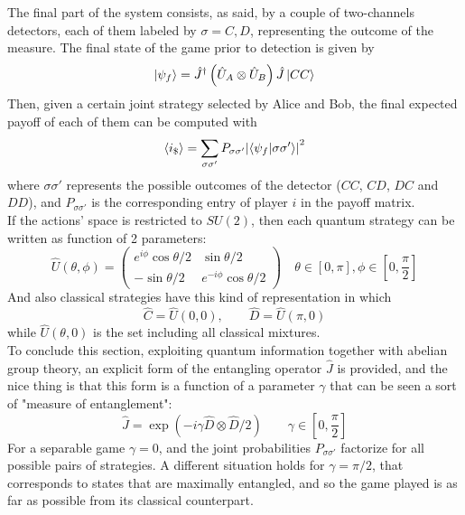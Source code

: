 The final part of the system consists, as said, by a couple of two-channels detectors, each of them labeled by $\sigma=C,D$, representing the outcome of the measure. The final state of the game prior to detection is given by
\[ \ket{\psi_f} = \hat{J}^\dagger\left(\hat{U}_A\otimes\hat{U}_B\right)\hat{J}\ket{CC} \]
Then, given a certain joint strategy selected by Alice and Bob, the final expected payoff of each of them can be computed with
\[ \expval{i_\$} = \sum_{\sigma\sigma'} P_{\sigma\sigma'}\abs{\bra{\psi_f}\ket{\sigma\sigma'}}^2 \]
where $\sigma\sigma'$ represents the possible outcomes of the detector ($CC$, $CD$, $DC$ and $DD$), and $P_{\sigma\sigma'}$ is the corresponding entry of player $i$ in the payoff matrix.\\
If the actions' space is restricted to $SU(2)$, then each quantum strategy can be written as function of 2 parameters:
\[ \hat{U}(\theta,\phi) = \begin{pmatrix}
e^{i\phi}\cos\theta/2 & \sin\theta/2 \\ -\sin\theta/2 & e^{-i\phi}\cos\theta/2
\end{pmatrix} \quad \theta\in[0,\pi], \phi\in[0,\frac{\pi}{2}] \]
And also classical strategies have this kind of representation in which
\[ \hat{C} = \hat{U}(0,0), \qquad \hat{D} = \hat{U}(\pi,0) \]
while $\hat{U}(\theta,0)$ is the set including all classical mixtures.\\
To conclude this section, exploiting quantum information together with abelian group theory, an explicit form of the entangling operator $\hat{J}$ is provided, and the nice thing is that this form is a function of a parameter $\gamma$ that can be seen a sort of "measure of entanglement":
\[ \hat{J} = \exp\left(-i\gamma\hat{D}\otimes\hat{D}/2\right) \qquad \gamma\in[0,\frac{\pi}{2}] \]
For a separable game $\gamma=0$, and the joint probabilities $P_{\sigma\sigma'}$ factorize for all possible pairs of strategies. A different situation holds for $\gamma = \pi/2$, that corresponds to states that are maximally entangled, and so the game played is as far as possible from its classical counterpart. 






